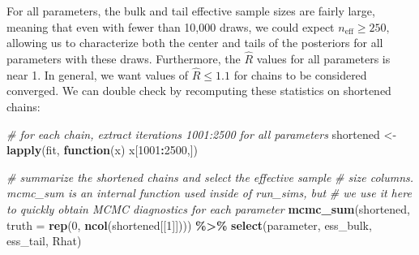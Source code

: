 \documentclass[
]{article}
\newenvironment{Shaded}{\begin{snugshade}}{\end{snugshade}}
\newcommand{\AttributeTok}[1]{\textcolor[rgb]{0.13,0.29,0.53}{#1}}
\newcommand{\CommentTok}[1]{\textcolor[rgb]{0.56,0.35,0.01}{\textit{#1}}}
\newcommand{\ControlFlowTok}[1]{\textcolor[rgb]{0.13,0.29,0.53}{\textbf{#1}}}
\newcommand{\DecValTok}[1]{\textcolor[rgb]{0.00,0.00,0.81}{#1}}
\newcommand{\FunctionTok}[1]{\textcolor[rgb]{0.13,0.29,0.53}{\textbf{#1}}}
\newcommand{\NormalTok}[1]{#1}
\newcommand{\OtherTok}[1]{\textcolor[rgb]{0.56,0.35,0.01}{#1}}
\newcommand{\SpecialCharTok}[1]{\textcolor[rgb]{0.81,0.36,0.00}{\textbf{#1}}}
\begin{document}
\linespread{1}

For all parameters, the bulk and tail effective sample sizes are fairly large, meaning that even with fewer than 10,000 draws, we could expect \(n_\text{eff} \geq 250,\) allowing us to characterize both the center and tails of the posteriors for all parameters with these draws. Furthermore, the \(\hat{R}\) values for all parameters is near 1. In general, we want values of \(\hat{R} \leq 1.1\) for chains to be considered converged. We can double check by recomputing these statistics on shortened chains:

\linespread{1}

\begin{Shaded}
\begin{Highlighting}[]
\CommentTok{\# for each chain, extract iterations 1001:2500 for all parameters}
\NormalTok{shortened }\OtherTok{\textless{}{-}} \FunctionTok{lapply}\NormalTok{(fit, }\ControlFlowTok{function}\NormalTok{(x) x[}\DecValTok{1001}\SpecialCharTok{:}\DecValTok{2500}\NormalTok{,])}

\CommentTok{\# summarize the shortened chains and select the effective sample }
\CommentTok{\# size columns. mcmc\_sum is an internal function used inside of \textasciigrave{}run\_sims\textasciigrave{}, but}
\CommentTok{\# we use it here to quickly obtain MCMC diagnostics for each parameter}
\FunctionTok{mcmc\_sum}\NormalTok{(shortened, }\AttributeTok{truth =} \FunctionTok{rep}\NormalTok{(}\DecValTok{0}\NormalTok{, }\FunctionTok{ncol}\NormalTok{(shortened[[}\DecValTok{1}\NormalTok{]]))) }\SpecialCharTok{\%\textgreater{}\%}
  \FunctionTok{select}\NormalTok{(parameter, ess\_bulk, ess\_tail, Rhat)}
\end{Highlighting}
\end{Shaded}
\end{document}
